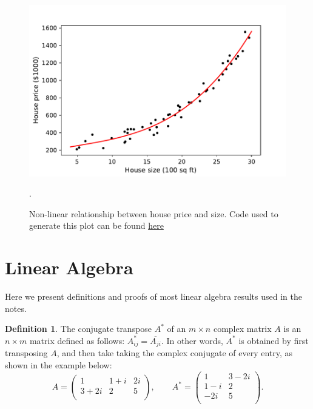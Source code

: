 \documentclass{article}
\theoremstyle{definition}
\newtheorem{definition}{Definition}[section]
\begin{document}
\begin{figure}[ht]
\centering
\includegraphics[scale=0.7]{images/lin_reg/poly-data.pdf}
\caption{Non-linear relationship between house price and size. Code used to generate this plot can be found \href{https://github.com/siavashaslanbeigi/ml_notes_supp/blob/master/lin_reg/poly.ipynb}{\color{blue} here}}.
\label{linreg-fig:poly-data}
\end{figure}


\appendix
\section{Linear Algebra}
Here we present definitions and proofs of most linear algebra results used in the notes.
\begin{definition}
The conjugate transpose $A^*$ of an $m\times n$ complex matrix $A$ is an $n \times m$ matrix defined as follows: $A^*_{ij}=\overline{A_{ji}}$. In other words, $A^*$ is obtained by first transposing $A$, and then take taking the complex conjugate of every entry, as shown in the example below:
\begin{equation}
    A =
    \begin{pmatrix}
        1 & 1+i & 2i \\
        3+2i & 2 & 5 \\
    \end{pmatrix},
    \qquad
    A^* =
    \begin{pmatrix}
        1 & 3-2i \\
        1-i & 2 \\
        -2i & 5 \\
    \end{pmatrix}.
\end{equation}
\end{definition}
\end{document}

